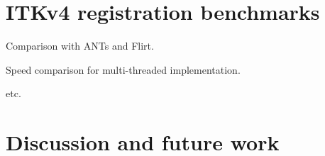 \documentclass{article}
\begin{document}
\section{ITKv4 registration benchmarks}

Comparison with ANTs and Flirt.  

Speed comparison for multi-threaded implementation.

etc.
\section{Discussion and future work}

\begin{comment}
{
\section{Deliverables}
\subsection{Usability}
\begin{description}
\item [Automate parameter scaling] base this on empirical statistics
  ``learning'' on a per registration problem basis.
\item [GetParameterSuggestion] metric and trasformation classes should
  recommend parameters from a developer-defined set.
\item [Multi-core implementations] multi threading of metric,
  regularization, parameter update, etc.  stephen indicates that the
  setparameters function may cause problems.   
\item [Unify the dense and sparse frameworks] metrics and
  transformations should be reusable across frameworks. 
\end{description}

\subsection{Data Types}
Transform vectors, curves and tensors with reorientation.

\subsection{Metrics}
\begin{description}
\item [metrics]  derivatives should be bi-directional.
\item [MI and NMI]  Shreyas --- MI and NMI multicore. 
\item [ATG Neighborhood Cross Correlation] our approximation to the
  NCC derivative.  
\item [PSE Metric] with arbitrary data type.  ObjectMetric ...
\item [Tractography/vector flow metric]  vector based.  distance transform?
\item [Multivariate metric] plug in metrics and weights and a
  ``combination'' strategy.  e.g. match 1-norm, 2-norm, etc before weighting. 
\end{description}


\end{comment}
\end{document}

